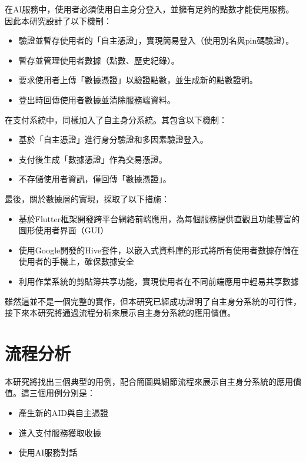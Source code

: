 在AI服務中，使用者必須使用自主身分登入，並擁有足夠的點數才能使用服務。因此本研究設計了以下機制：
\begin{itemize}
  \item 驗證並暫存使用者的「自主憑證」，實現簡易登入（使用別名與pin碼驗證）。
  \item 暫存並管理使用者數據（點數、歷史紀錄）。
  \item 要求使用者上傳「數據憑證」以驗證點數，並生成新的點數證明。
  \item 登出時回傳使用者數據並清除服務端資料。
\end{itemize}
在支付系統中，同樣加入了自主身分系統。其包含以下機制：
\begin{itemize}
  \item 基於「自主憑證」進行身分驗證和多因素驗證登入。
  \item 支付後生成「數據憑證」作為交易憑證。
  \item 不存儲使用者資訊，僅回傳「數據憑證」。
\end{itemize}
最後，關於數據層的實現，採取了以下措施：
\begin{itemize}
  \item 基於Flutter框架開發跨平台網絡前端應用，為每個服務提供直觀且功能豐富的圖形使用者界面（GUI）
  \item 使用Google開發的Hive套件，以嵌入式資料庫的形式將所有使用者數據存儲在使用者的手機上，確保數據安全
  \item 利用作業系統的剪貼簿共享功能，實現使用者在不同前端應用中輕易共享數據
\end{itemize}
雖然這並不是一個完整的實作，但本研究已經成功證明了自主身分系統的可行性，接下來本研究將通過流程分析來展示自主身分系統的應用價值。
\section{流程分析}
本研究將找出三個典型的用例，配合簡圖與細節流程來展示自主身分系統的應用價值。這三個用例分別是：
\begin{itemize}
  \item 產生新的AID與自主憑證
  \item 進入支付服務獲取收據
  \item 使用AI服務對話
\end{itemize}
